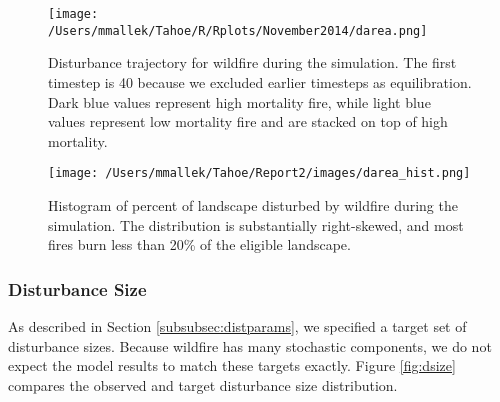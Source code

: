 
\begin{figure}[!htbp]
\centering
\texttt{[image: /Users/mmallek/Tahoe/R/Rplots/November2014/darea.png]}
\caption{Disturbance trajectory for wildfire during the simulation. The first timestep is 40 because we excluded earlier timesteps as equilibration. Dark blue values represent high mortality fire, while light blue values represent low mortality fire and are stacked on top of high mortality.}
\label{fig:darea}
\end{figure}

\begin{figure}[!htbp]
\centering
\texttt{[image: /Users/mmallek/Tahoe/Report2/images/darea\_hist.png]}
\caption{Histogram of percent of landscape disturbed by wildfire during the simulation. The distribution is substantially right-skewed, and most fires burn less than 20\% of the eligible landscape.}
\label{fig:darea_hist}
\end{figure}



\subsubsection{Disturbance Size}
As described in Section \ref{subsubsec:distparams}, we specified a target set of disturbance sizes. Because wildfire has many stochastic components, we do not expect the model results to match these targets exactly. Figure \ref{fig:dsize} compares the observed and target disturbance size distribution.


